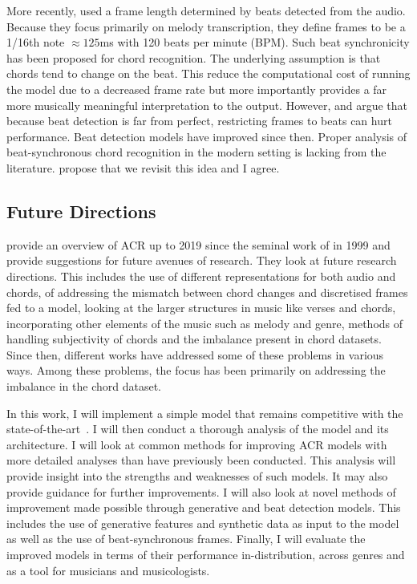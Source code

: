 More recently, \citet{MelodyTranscriptionViaGenerativePreTraining} used a frame length determined by beats detected from the audio. Because they focus primarily on melody transcription, they define frames to be a 1/16th note $\approx 125$ms with 120 beats per minute (BPM). Such beat synchronicity has been proposed for chord recognition. The underlying assumption is that chords tend to change on the beat. This reduce the computational cost of running the model due to a decreased frame rate but more importantly provides a far more musically meaningful interpretation to the output. However, \citet{CommonVariations} and \citet{RelativePerformance} argue that because beat detection is far from perfect, restricting frames to beats can hurt performance. Beat detection models have improved since then. Proper analysis of beat-synchronous chord recognition in the modern setting is lacking from the literature.  \citet{20YearsofACR} propose that we revisit this idea and I agree.

\subsection{Future Directions}

\citet{20YearsofACR} provide an overview of ACR up to 2019 since the seminal work of \citet{FujishimaACR} in 1999 and provide suggestions for future avenues of research. They look at future research directions. This includes the use of different representations for both audio and chords, of addressing the mismatch between chord changes and discretised frames fed to a model, looking at the larger structures in music like verses and chords, incorporating other elements of the music such as melody and genre, methods of handling subjectivity of chords and the imbalance present in chord datasets. Since then, different works have addressed some of these problems in various ways. Among these problems, the focus has been primarily on addressing the imbalance in the chord dataset. 

In this work, I will implement a simple model that remains competitive with the state-of-the-art~\citep{StructuredTraining}. I will then conduct a thorough analysis of the model and its architecture. I will look at common methods for improving ACR models with more detailed analyses than have previously been conducted. This  analysis will provide insight into the strengths and weaknesses of such models. It may also provide guidance for further improvements. I will also look at novel methods of improvement made possible through generative and beat detection models. This includes the use of generative features and synthetic data as input to the model as well as the use of beat-synchronous frames. Finally, I will evaluate the improved models in terms of their performance in-distribution, across genres and as a tool for musicians and musicologists.

